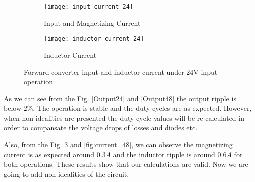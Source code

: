 \begin{figure}[H]
\centering
\begin{subfigure}{7 cm}
  \centering
  \texttt{[image: input\_current\_24]}
  \caption{Input and Magnetizing Current}
  \label{fig:input_current_24}
\end{subfigure}%
\begin{subfigure}{7 cm}
  \centering
  \texttt{[image: inductor\_current\_24]}
  \caption{Inductor Current}
  \label{fig:inductor_current_24}
\end{subfigure}
\caption{Forward converter input and inductor current under 24V input operation}
\label{fig:current_24}
\end{figure}


As we can see from the Fig. \ref{Output24} and \ref{Output48} the output ripple is below $2\%$. The operation is stable and the duty cycles are as expected. However, when non-idealities are presented the duty cycle values will be re-calculated in order to compansate the voltage drops of losses and diodes etc. 

Also, from the Fig. \ref{fig:current_24} and \ref{fig:current_48}, we can observe the magnetizing current is as expected around $0.3A$ and the inductor ripple is around $0.6A$ for both operations. These results show that our calculations are valid. Now we are going to add non-idealities of the circuit.







